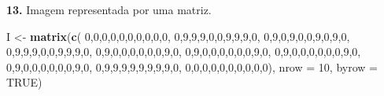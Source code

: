 \documentclass[
  portuguese,
  11pt,
  openany]{book}
\newenvironment{Shaded}{\begin{snugshade}}{\end{snugshade}}
\newcommand{\AttributeTok}[1]{\textcolor[rgb]{0.13,0.29,0.53}{#1}}
\newcommand{\ConstantTok}[1]{\textcolor[rgb]{0.56,0.35,0.01}{#1}}
\newcommand{\DecValTok}[1]{\textcolor[rgb]{0.00,0.00,0.81}{#1}}
\newcommand{\FunctionTok}[1]{\textcolor[rgb]{0.13,0.29,0.53}{\textbf{#1}}}
\newcommand{\NormalTok}[1]{#1}
\newcommand{\OtherTok}[1]{\textcolor[rgb]{0.56,0.35,0.01}{#1}}
\begin{document}
\textbf{13.} Imagem representada por uma matriz.

\begin{Shaded}
\begin{Highlighting}[]
\NormalTok{I }\OtherTok{\textless{}{-}} \FunctionTok{matrix}\NormalTok{(}\FunctionTok{c}\NormalTok{(}
  \DecValTok{0}\NormalTok{,}\DecValTok{0}\NormalTok{,}\DecValTok{0}\NormalTok{,}\DecValTok{0}\NormalTok{,}\DecValTok{0}\NormalTok{,}\DecValTok{0}\NormalTok{,}\DecValTok{0}\NormalTok{,}\DecValTok{0}\NormalTok{,}\DecValTok{0}\NormalTok{,}\DecValTok{0}\NormalTok{,  }\DecValTok{0}\NormalTok{,}\DecValTok{9}\NormalTok{,}\DecValTok{9}\NormalTok{,}\DecValTok{9}\NormalTok{,}\DecValTok{0}\NormalTok{,}\DecValTok{0}\NormalTok{,}\DecValTok{9}\NormalTok{,}\DecValTok{9}\NormalTok{,}\DecValTok{9}\NormalTok{,}\DecValTok{0}\NormalTok{,  }\DecValTok{0}\NormalTok{,}\DecValTok{9}\NormalTok{,}\DecValTok{0}\NormalTok{,}\DecValTok{9}\NormalTok{,}\DecValTok{0}\NormalTok{,}\DecValTok{0}\NormalTok{,}\DecValTok{9}\NormalTok{,}\DecValTok{0}\NormalTok{,}\DecValTok{9}\NormalTok{,}\DecValTok{0}\NormalTok{,}
  \DecValTok{0}\NormalTok{,}\DecValTok{9}\NormalTok{,}\DecValTok{9}\NormalTok{,}\DecValTok{9}\NormalTok{,}\DecValTok{0}\NormalTok{,}\DecValTok{0}\NormalTok{,}\DecValTok{9}\NormalTok{,}\DecValTok{9}\NormalTok{,}\DecValTok{9}\NormalTok{,}\DecValTok{0}\NormalTok{,  }\DecValTok{0}\NormalTok{,}\DecValTok{9}\NormalTok{,}\DecValTok{0}\NormalTok{,}\DecValTok{0}\NormalTok{,}\DecValTok{0}\NormalTok{,}\DecValTok{0}\NormalTok{,}\DecValTok{0}\NormalTok{,}\DecValTok{0}\NormalTok{,}\DecValTok{9}\NormalTok{,}\DecValTok{0}\NormalTok{,  }\DecValTok{0}\NormalTok{,}\DecValTok{9}\NormalTok{,}\DecValTok{0}\NormalTok{,}\DecValTok{0}\NormalTok{,}\DecValTok{0}\NormalTok{,}\DecValTok{0}\NormalTok{,}\DecValTok{0}\NormalTok{,}\DecValTok{0}\NormalTok{,}\DecValTok{9}\NormalTok{,}\DecValTok{0}\NormalTok{,}
  \DecValTok{0}\NormalTok{,}\DecValTok{9}\NormalTok{,}\DecValTok{0}\NormalTok{,}\DecValTok{0}\NormalTok{,}\DecValTok{0}\NormalTok{,}\DecValTok{0}\NormalTok{,}\DecValTok{0}\NormalTok{,}\DecValTok{0}\NormalTok{,}\DecValTok{9}\NormalTok{,}\DecValTok{0}\NormalTok{,  }\DecValTok{0}\NormalTok{,}\DecValTok{9}\NormalTok{,}\DecValTok{0}\NormalTok{,}\DecValTok{0}\NormalTok{,}\DecValTok{0}\NormalTok{,}\DecValTok{0}\NormalTok{,}\DecValTok{0}\NormalTok{,}\DecValTok{0}\NormalTok{,}\DecValTok{9}\NormalTok{,}\DecValTok{0}\NormalTok{,  }\DecValTok{0}\NormalTok{,}\DecValTok{9}\NormalTok{,}\DecValTok{9}\NormalTok{,}\DecValTok{9}\NormalTok{,}\DecValTok{9}\NormalTok{,}\DecValTok{9}\NormalTok{,}\DecValTok{9}\NormalTok{,}\DecValTok{9}\NormalTok{,}\DecValTok{9}\NormalTok{,}\DecValTok{0}\NormalTok{,}
  \DecValTok{0}\NormalTok{,}\DecValTok{0}\NormalTok{,}\DecValTok{0}\NormalTok{,}\DecValTok{0}\NormalTok{,}\DecValTok{0}\NormalTok{,}\DecValTok{0}\NormalTok{,}\DecValTok{0}\NormalTok{,}\DecValTok{0}\NormalTok{,}\DecValTok{0}\NormalTok{,}\DecValTok{0}\NormalTok{), }\AttributeTok{nrow =} \DecValTok{10}\NormalTok{, }\AttributeTok{byrow =} \ConstantTok{TRUE}\NormalTok{)}


\end{Highlighting}
\end{Shaded}
\end{document}
